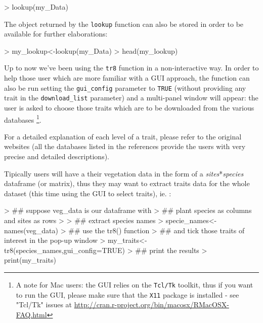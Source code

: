 \documentclass{article}
\begin{document}
\begin{Schunk}
\begin{Sinput}
> lookup(my_Data)
\end{Sinput}
\end{Schunk}

   The object returned by the \texttt{lookup} function can also be stored in order to be available for further elaborations:
   
\begin{Schunk}
\begin{Sinput}
> my_lookup<-lookup(my_Data)
> head(my_lookup)
\end{Sinput}
\end{Schunk}

    Up to now we've been using the \texttt{tr8} function in a non-interactive way. In order to help those user which are more familiar with a GUI approach,
    the function can also be run setting the \texttt{gui\_config} parameter to \texttt{TRUE} (without providing any trait in the \texttt{download\_list} parameter) and a multi-panel window will appear: the user is asked to choose those
  traits which are to be downloaded from the various databases \footnote{A note for Mac users: the GUI relies on the \texttt{Tcl/Tk} toolkit, thus if you want to run the GUI, please make sure that the \texttt{X11} package is installed - see "Tcl/Tk" issues at \url{http://cran.r-project.org/bin/macosx/RMacOSX-FAQ.html}}.

  For a detailed explanation of each level of a trait, please refer to
  the original websites (all the databases listed in the references
  provide the users with very precise and detailed descriptions).

   Tipically users will have a their vegetation data in the form of a
   \textit{sites}*\textit{species} dataframe (or matrix), thus they
   may want to extract traits data for the whole dataset (this time using the GUI to select traits), ie. :
   
\begin{Schunk}
\begin{Sinput}
> ## suppose veg_data is our dataframe with
> ## plant species as columns and sites as rows
> 
> ## extract species names
> specie_names<-names(veg_data)
> ## use the tr8() function
> ## and tick those traits of interest in the pop-up window
> my_traits<-tr8(species_names,gui_config=TRUE)
> ## print the results
> print(my_traits)
\end{Sinput}
\end{Schunk}
\end{document}
